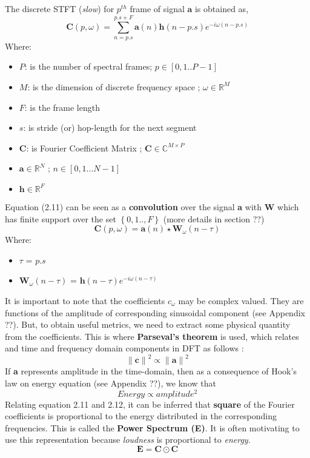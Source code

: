 The discrete STFT (\textit{slow}) for $p^{th}$ frame of signal $\textbf{a}$ is obtained as,
\begin{equation}
\textbf{C}(p, \omega ) = \displaystyle\sum_{n=p.s}^{p.s + F}\textbf{a}(n)\textbf{h}(n-p.s)e^{-i \omega (n-p.s)}
\end{equation}
Where:
\begin{itemize}[label=]
    \setlength\itemsep{0em}
    \item $P$: is the number of spectral frames; $p \in [0,1..P-1]$ 
    \item $M$: is the dimension of discrete frequency space ; $\omega \in \mathbb{R}^{M}$
    \item $F$: is the frame length 
    \item $s$: is stride (or) hop-length for the next segment
    \item $\textbf{C}$: is Fourier Coefficient Matrix ; $\textbf{C} \in \mathbb{C}^{M \times P}$
    \item $\textbf{a} \in  \mathbb{R}^{N}$ ; $n \in [0,1...N-1]$
    \item $\textbf{h} \in  \mathbb{R}^{F}$
\end{itemize}

\noindent Equation (2.11) can be seen as a \textbf{convolution} over the signal \textbf{a} with \textbf{W} which has finite support over the set $\left\{0,1..,F \right\}$ (more details in section ??)
\begin{equation}
\boxed
{
  \textbf{C}(p, \omega ) = \textbf{a}(n) \star \textbf{W}_{\omega}(n- \tau)
}
\end{equation}
Where:
\begin{itemize}[label=]
    \setlength\itemsep{0em}
    \item $ \tau$ = $p.s$
    \item $\textbf{W}_{\omega}(n- \tau)$ = $\textbf{h}(n- \tau )e^{-i \omega (n- \tau)}$
\end{itemize}
It is important to note that the coefficients $c_{\omega}$ may be complex valued. They are functions of the amplitude of corresponding sinusoidal component (see Appendix ??). But, to obtain useful metrics, we need to extract some physical quantity from the coefficients. This is where \textbf{Parseval's theorem} is used, which relates and time and frequency domain components in DFT as follows \cite{allen} :
\begin{equation}
{\|\textbf{c}\|}^2 \propto {\|\textbf{a}\|}^2
\end{equation}
If \textbf{a} represents amplitude in the time-domain, then as a consequence of Hook's law  on energy equation (see Appendix ??), we know that
\begin{equation}
Energy \propto amplitude^2
\end{equation}
Relating equation 2.11 and 2.12, it can be inferred that \textbf{square} of the Fourier coefficients is proportional to the energy distributed in the corresponding frequencies. This is called the \textbf{Power Spectrum (E)}. It is often motivating to use this representation because \textit{loudness} is proportional to \textit{energy}.
\begin{equation}
\textbf{E} = \textbf{C} \odot \textbf{C}
\end{equation}

